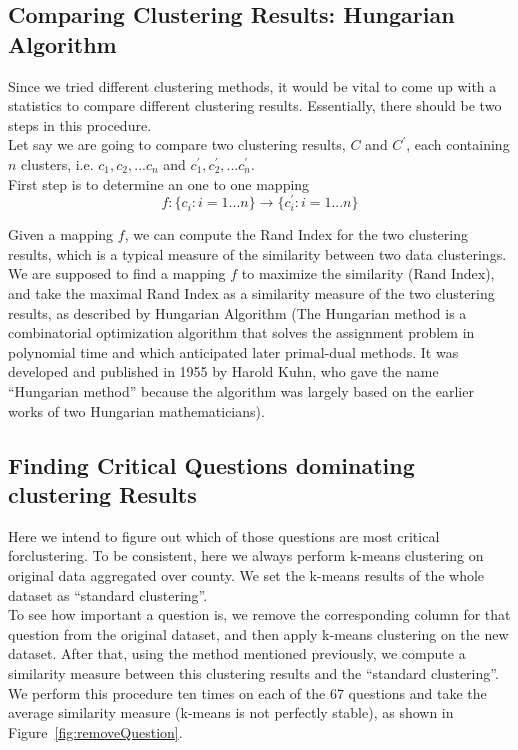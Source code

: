 \subsection{Comparing Clustering Results: Hungarian Algorithm}

Since we tried different clustering methods, it would be vital to come
up with a statistics to compare different clustering
results. Essentially, there should be two steps in this procedure. \\

\noindent Let say we are going to compare two clustering results, $C$
and $C^{'}$, each containing $n$ clusters, i.e. $c_1, c_2, ... c_n$
and $c^{'}_1, c^{'}_2, ... c^{'}_n$.\\

\noindent First step is to determine an one to one mapping
$$f: \{c_i: i=1...n\} \rightarrow \{c^{'}_i: i=1...n\}$$

\noindent Given a mapping $f$, we can compute the Rand Index for the
two clustering results, which is a typical measure of the similarity
between two data clusterings.\\

\noindent We are supposed to find a mapping $f$ to maximize the
similarity (Rand Index), and take the maximal Rand Index as a
similarity measure of the two clustering results, as described by
Hungarian Algorithm\cite{hungarian} (The Hungarian method is a combinatorial
optimization algorithm that solves the assignment problem in
polynomial time and which anticipated later primal-dual methods. It
was developed and published in 1955 by Harold Kuhn, who gave the name
``Hungarian method'' because the algorithm was largely based on the
earlier works of two Hungarian mathematicians).


\subsection{Finding Critical Questions dominating clustering Results}

Here we intend to figure out which of those questions are most
critical forclustering. To be consistent, here we always perform k-means
clustering on original data aggregated over county. We set the k-means
results of the whole dataset as ``standard clustering''.\\

\noindent To see how important a question is, we remove the
corresponding column for that question from the original dataset, and
then apply k-means clustering on the new dataset. After that, using
the method mentioned previously, we compute a similarity measure
between this clustering results and the ``standard clustering''. We
perform this procedure ten times on each of the 67 questions and take the average similarity measure (k-means is not perfectly stable), as shown in
Figure~\ref{fig:removeQuestion}.\\


